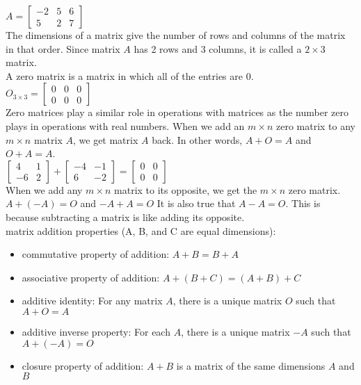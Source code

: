 \documentclass{article}
\begin{document}
$A = 
\begin{bmatrix}
	-2 & 5 & 6\\
	5 & 2 & 7
\end{bmatrix}
$\\

The dimensions of a matrix give the number of rows and columns of the matrix in that order. Since matrix $A$ has 2 rows and 3 columns, it is called a $2 \times 3$ matrix.\\

A zero matrix is a matrix in which all of the entries are 0.\\

$O_{3 \times 3} = 
\begin{bmatrix}
	0 & 0 & 0\\
	0 & 0 & 0
\end{bmatrix}
$\\

Zero matrices play a similar role in operations with matrices as the number zero plays in operations with real numbers. When we add an $m \times n$ zero matrix to any $m \times n$ matrix $A$, we get matrix $A$ back. In other words, $A + O = A$ and $O + A = A$.\\

$
\begin{bmatrix}
	4 & 1\\
	-6 & 2
\end{bmatrix}
+
\begin{bmatrix}
	-4 & -1\\
	6 & -2
\end{bmatrix}
=
\begin{bmatrix}
	0 & 0\\
	0 & 0
\end{bmatrix}
$\\

When we add any $m \times n$ matrix to its opposite, we get the $m \times n$ zero matrix. $A + (-A) = O$ and $-A + A = O$ It is also true that $A - A = O$. This is because subtracting a matrix is like adding its opposite.\\

matrix addition properties (A, B, and C are equal dimensions):
	\begin{itemize}
		\item commutative property of addition: $A + B = B + A$
		\item associative property of addition: $A + (B + C) = (A + B) + C$
		\item additive identity: For any matrix $A$, there is a unique matrix $O$ such that $A + O = A$
		\item additive inverse property: For each $A$, there is a unique matrix $-A$ such that $A + (-A) = O$
		\item closure property of addition: $A + B$ is a matrix of the same dimensions $A$ and $B$
	\end{itemize}
\end{document}
